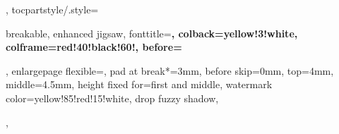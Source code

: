 {{  },
  tocpartstyle/.style={%
    breakable,%
    enhanced jigsaw,%
    fonttitle=\sffamily\bfseries\large,%
    colback=yellow!3!white,%
    colframe=red!40!black!60!,%
    before=\par\bigskip\noindent,%
    enlargepage flexible=\baselineskip,%
    pad at break*=3mm,%
    before skip=0mm,%
    top=4mm,%
    middle=4.5mm,
    height fixed for=first and middle,%
    watermark color=yellow!85!red!15!white,%
    drop fuzzy shadow,
  },
}

